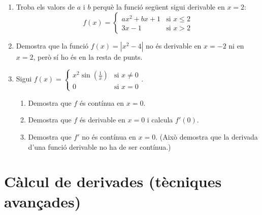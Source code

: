 \documentclass[12pt]{article}
\begin{document}
\begin{enumerate}[label=\arabic*.]
    \item Troba els valors de $a$ i $b$ perquè la funció següent sigui derivable en $x=2$:
    \[
    f(x)=
    \begin{cases}
        ax^2 + bx + 1 & \text{si } x \le 2 \\
        3x - 1 & \text{si } x > 2
    \end{cases}
    \]

    \item Demostra que la funció $f(x)=|x^2-4|$ no és derivable en $x=-2$ ni en $x=2$, però sí ho és en la resta de punts.

    \item Sigui $f(x)=
    \begin{cases}
        x^2 \sin\left(\frac{1}{x}\right) & \text{si } x \neq 0 \\
        0 & \text{si } x = 0
    \end{cases}$.
    \begin{enumerate}[label=\alph*)]
        \item Demostra que $f$ és contínua en $x=0$.
        \item Demostra que $f$ és derivable en $x=0$ i calcula $f'(0)$.
        \item Demostra que $f'$ no és contínua en $x=0$. (Això demostra que la derivada d'una funció derivable no ha de ser contínua.)
    \end{enumerate}
\end{enumerate}

\section*{Càlcul de derivades (tècniques avançades)}
\end{document}
